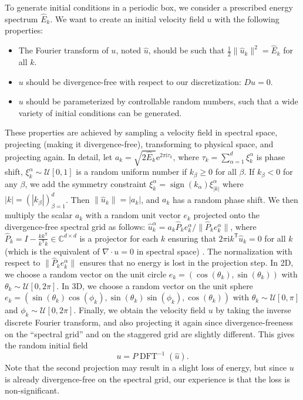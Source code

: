 \documentclass[preprint]{elsarticle}
\begin{document}
To generate initial conditions in a periodic box, we consider a prescribed
energy spectrum $\hat{E}_k$. We want to create an initial velocity field $u$
with the following properties:
\begin{itemize}
    \item The Fourier transform of $u$, noted $\hat{u}$, should be such that
        $\frac{1}{2} \| \hat{u}_k \|^2 = \hat{E}_k$ for all $k$.
    \item $u$ should be divergence-free with respect to our
        discretization: $D u = 0$.
    \item $u$ should be parameterized by controllable random numbers, such
        that a wide variety of initial conditions can be generated.
\end{itemize}
These properties are achieved by sampling a velocity field in spectral space,
projecting (making it divergence-free), transforming to physical space, and
projecting again. In detail, let $a_k = \sqrt{2 \hat{E}_k} \mathrm{e}^{2 \pi
\mathrm{i} \tau_k}$, where  $\tau_k = \sum_{\alpha = 1}^d \xi_k^\alpha$ is phase
shift, $\xi_k^\alpha \sim \mathcal{U}[0, 1]$ is a random uniform number if
$k_\beta \geq 0$ for all $\beta$. If $k_\beta < 0$ for any $\beta$, we add the
symmetry constraint $\xi_k^\alpha = \operatorname{sign}(k_\alpha)
\xi_{|k|}^\alpha$ where $|k| = (|k_\beta|)_{\beta = 1}^d$. Then $\| \hat{u}_k \|
= | a_k |$, and $a_k$ has a random phase shift. We then multiply the scalar
$a_k$ with a random unit vector $e_k$ projected onto the divergence-free
spectral grid as follows: $\hat{u}^\alpha_k = a_k \hat{P}_k e^\alpha_k / \|
\hat{P}_k e^\alpha_k \|$, where $\hat{P}_k = I - \frac{k
k^\mathsf{T}}{k^\mathsf{T} k} \in \mathbb{C}^{d \times d}$ is a projector
for each $k$ ensuring that $2 \pi \mathrm{i} k^\mathsf{T} \hat{u}_k = 0$ for all
$k$ (which is the equivalent of $\nabla \cdot u = 0$ in spectral space)
\cite{Pope2000}. The normalization with respect to $\| \hat{P}_k e^\alpha_k \|$
ensures that no energy is lost in the projection step. In 2D, we choose a random
vector on the unit circle $e_k = (\cos(\theta_k), \sin(\theta_k))$ with
$\theta_k \sim \mathcal{U}[0, 2 \pi]$. In 3D, we choose a random vector on the
unit sphere $e_k = (\sin(\theta_k) \cos(\phi_k), \sin(\theta_k) \sin(\phi_k),
\cos(\theta_k))$ with $\theta_k \sim \mathcal{U}[0, \pi]$ and $\phi_k \sim
\mathcal{U}[0, 2 \pi]$. Finally, we obtain the velocity field $u$ by taking the
inverse discrete Fourier transform, and also projecting it again since
divergence-freeness on the ``spectral grid'' and on the staggered grid are
slightly different. This gives the random initial field
\begin{equation}
    u = P \operatorname{DFT}^{-1}(\hat{u}).
\end{equation}
Note that the second projection may result in a slight loss of energy, but since
$u$ is already divergence-free on the spectral grid, our experience is that the loss is non-significant.
\end{document}
